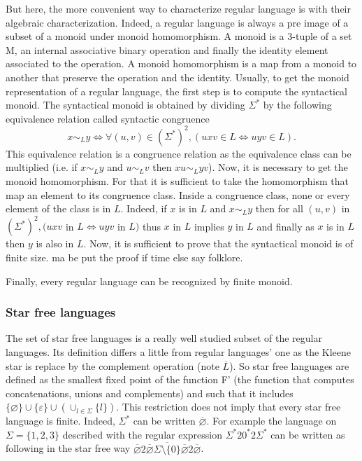 But here, the more convenient way to characterize regular language is with their
algebraic characterization. Indeed, a regular language is always a pre image of a subset
of a monoid under monoid homomorphism. A monoid is a 3-tuple of a set M, an
internal associative binary operation and finally the identity element associated to the
operation. A monoid homomorphism is a map from a monoid to another that preserve the
operation and the identity. Usually, to get the monoid representation of a regular
language, the first step is to compute the syntactical monoid. The syntactical monoid is
obtained by dividing $\Sigma^*$ by the following equivalence relation called syntactic
congruence
\[x \sim_L y \Leftrightarrow \forall (u, v) \in \left(\Sigma^*\right)^2, (uxv \in L \Leftrightarrow uyv \in L).\]
This equivalence relation is a congruence relation as the equivalence class can be multiplied
(i.e. if $x\sim_L y$ and $u \sim_L v$ then $xu \sim_L yv$). Now, it is necessary to get the monoid
homomorphism. For that it is sufficient to take the homomorphism that map an element to its
congruence class. Inside a congruence class, none or every element of the class is in $L$.
Indeed,  if $x$ is in $L$ and $x \sim_L y$ then for all
$(u, v)$ in $\left(\Sigma^*\right)^2, (uxv$ in $L \Leftrightarrow uyv$ in $L)$ thus
$x$ in $L$ implies $y$ in $L$ and finally as $x$ is in $L$ then $y$ is also in $L$.
Now, it is sufficient to prove that the syntactical monoid is of finite size.
{\color{red} ma be put the proof if time else say folklore.}

Finally, every regular language can be recognized by finite monoid.

\subsubsection{Star free languages}\label{ssec:starfree}

The set of star free languages is a really well studied subset of the regular languages.
Its definition differs a little from regular languages' one as the Kleene star is replace
by the complement operation (note $\overline{L}$). So star free languages are defined
as the smallest fixed point of the function F' (the function that computes concatenations, unions
and complements) and such that it includes
$\{\varnothing\} \cup \{\varepsilon\} \cup(\cup_{l\in\Sigma}\{l\})$.
This restriction does not imply that every star free language is finite. Indeed,
$\Sigma^*$ can be written $\overline{\varnothing}$. For example the language on
$\Sigma = \{1, 2, 3\}$ described with the regular expression $\Sigma^*20^*2\Sigma^*$ can be written
as following in the star free way
$\overline{\varnothing}2\overline{\overline{\varnothing}\Sigma{\setminus}\{0\}\overline{\varnothing}}2\overline{\varnothing}$.

